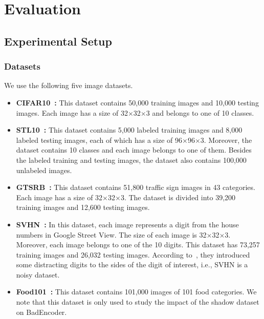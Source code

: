 











\section{Evaluation}
\label{sec:exp}
\subsection{Experimental Setup}


\subsubsection{Datasets} We use the following five image datasets.
\begin{itemize}
    
\item {\bf CIFAR10~\cite{krizhevsky2009learning}:} This dataset contains 50,000  training images and 10,000  testing images. Each image has a size of 32$\times$32$\times$3 and belongs to one of 10 classes. 

\item {\bf STL10~\cite{coates2011analysis}:} 
This dataset contains 5,000 labeled training images and 8,000 labeled testing images, each of which has a size of 96$\times$96$\times$3. Moreover, the dataset contains 10 classes and each image belongs to one of them. Besides the labeled training and testing images, the dataset also contains 100,000 unlabeled images.  

\item {\bf GTSRB~\cite{stallkamp2012man}:} This dataset contains 51,800 traffic sign images in 43 categories. Each image has a size of 32$\times$32$\times$3. The dataset is divided into 39,200 training images and 12,600 testing images. 

\item {\bf SVHN~\cite{netzer2011reading}:} In this dataset,  each image represents a digit from the house numbers in Google Street View. The size of each image is 32$\times$32$\times$3. Moreover, each image belongs to one of the 10 digits. This dataset has 73,257 training images and 26,032 testing images. According to~\cite{netzer2011reading}, they introduced some distracting digits to the sides of the digit of interest, i.e., SVHN is a noisy dataset. 

\item {\bf Food101~\cite{bossard14}:} This dataset contains   101,000 images of 101 food categories. We note that this dataset is only used to study the impact of the shadow dataset on BadEncoder. 
\end{itemize}


